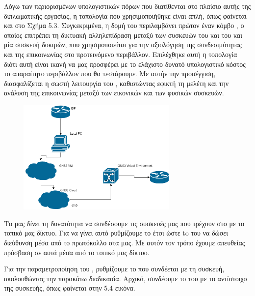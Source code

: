 Λόγω των περιορισμένων υπολογιστικών πόρων που διατίθενται στο πλαίσιο αυτής της διπλωματικής εργασίας, η τοπολογία που χρησιμοποιήθηκε είναι απλή, όπως φαίνεται και στο Σχήμα 5.3. Συγκεκριμένα, η δομή του  περιλαμβάνει πρώτον έναν κόμβο , ο οποίος επιτρέπει τη δικτυακή αλληλεπίδραση μεταξύ των συσκευών του  και του  και μία συσκευή δοκιμών, που χρησιμοποιείται για την αξιολόγηση της συνδεσιμότητας και της επικοινωνίας στο προτεινόμενο περιβάλλον. Επιλέχθηκε αυτή η τοπολογία διότι αυτή είναι ικανή να μας προσφέρει με το ελάχιστο δυνατό υπολογιστικό κόστος το απαραίτητο περιβάλλον που θα τεστάρουμε.
Με αυτήν την προσέγγιση, διασφαλίζεται η σωστή λειτουργία του , καθιστώντας εφικτή τη μελέτη και την ανάλυση της επικοινωνίας μεταξύ των εικονικών και των φυσικών συσκευών.

\FloatBarrier

\begin{figure}[htb]
	\centering
	\includegraphics[width=0.7\textwidth]{graphics/diagram.drawio.png}
	\caption{ }
\end{figure}

\FloatBarrier

Το  μας δίνει τη δυνατότητα να συνδέσουμε τις συσκευές μας που τρέχουν στο  με το τοπικό μας δίκτυο. Για να γίνει αυτό ρυθμίζουμε το  έτσι ώστε to  του να δώσει  διεύθυνση μέσα από το  πρωτόκολλο στα  μας. Με αυτόν τον τρόπο έχουμε απευθείας πρόσβαση σε αυτά μέσα από το τοπικό μας δίκτυο.

Για την παραμετροποίηση του , ρυθμίζουμε το  που συνδέεται με τη συσκευή, ακολουθώντας την παρακάτω διαδικασία. Αρχικά, συνδέουμε το  του  με το αντίστοιχο  της συσκευής, όπως φαίνεται στην 5.4 εικόνα. 

